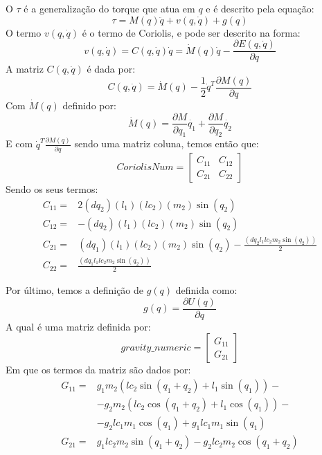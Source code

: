 \documentclass[a4paper,twocolumn,final,11pt]{article}
\begin{document}
O $\tau$ é a generalização do torque que atua em $q$ e é descrito pela equação:
\begin{equation}
   \tau= M(q)\ddot{q}+v(q,\dot{q})+g(q)
   \label{taueq}
\end{equation}
O termo $v(q,\dot{q})$ é o termo de Coriolis, e pode ser descrito na forma: 
\begin{equation}
   v(q,\dot{q})=C(q,\dot{q})\dot{q}= \dot{M}(q)\dot{q}-\frac{\partial E (q,\dot{q})}{\partial q}
\end{equation}
A matriz $C(q,\dot{q})$ é dada por:
\begin{equation}
C(q,\dot{q})=\dot{M}(q)-\frac{1}{2}\dot{q}^T\frac{\partial M(q)}{\partial q}
\end{equation}
Com $\dot{M}(q)$ definido por:
\begin{equation}
  \dot{M}(q) =\frac{\partial M }{\partial q_1}\dot{q_1}+\frac{\partial M }{\partial q_2}\dot{q_2}
\end{equation}
E com $\dot{q}^T\frac{\partial M(q)}{\partial q}$ sendo uma matriz coluna, temos então que:
\begin{equation}
CoriolisNum=
\begin{bmatrix}
C_{11} & C_{12} \\
C_{21} & C_{22}
\end{bmatrix}
\end{equation}
Sendo os seus termos:
\begin{align*}
    C_{11} = & 2(dq_2)(l_1)(lc_2)(m_2)\sin(q_2)\\
    C_{12} = & -(dq_2)(l_1)(lc_2)(m_2)\sin(q_2)\\
    C_{21} = &  (dq_1)(l_1)(lc_2)(m_2)\sin(q_2) -\frac{(dq_2l_1lc_2m_2\sin(q_2))}{2}\\
    C_{22} = & \frac{(dq_1l_1lc_2m_2\sin(q_2))}{2}
\end{align*}

Por último, temos a definição de $g(q)$ definida como:
\begin{equation}
    g(q)=\frac{\partial U(q)}{\partial q}
\end{equation}
A qual é uma matriz definida por:
\begin{equation}
gravity\_numeric=
\begin{bmatrix}
G_{11}  \\
G_{21} 
\end{bmatrix}
\end{equation}
Em que os termos da matriz são dados por:
\begin{align*}
    G_{11} = & g_1m_2(lc_2\sin(q_1 + q_2) + l_1\sin(q_1)) -\\ &-g_2m_2(lc_2\cos(q_1 + q_2) + l_1\cos(q_1)) -\\ &-g_2lc_1m_1\cos(q_1) + g_1lc_1m_1\sin(q_1)\\
    G_{21} = & g_1lc_2m_2\sin(q_1 + q_2) - g_2lc_2m_2\cos(q_1 + q_2)\\
\end{align*}
\end{document}
